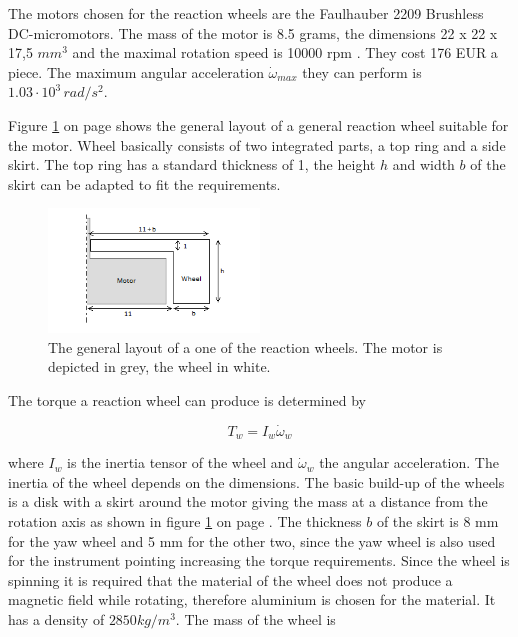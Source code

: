 The motors chosen for the reaction wheels are the Faulhauber 2209 Brushless DC-micromotors. The mass of the motor is 8.5 grams, the dimensions 22 x 22 x 17,5 $mm^3$ and the maximal rotation speed is 10000 rpm \cite{faulhaber}. They cost 176 EUR a piece. The maximum angular acceleration $\dot{\omega}_{max}$ they can perform is $1.03\cdot 10^3\,rad/s^2$. 

Figure \ref{fig:wheel} on page \pageref{fig:wheel} shows the general layout of a general reaction wheel suitable for the motor. Wheel basically consists of two integrated parts, a top ring and a side skirt. The top ring has a standard thickness of 1, the height $h$ and width $b$ of the skirt can be adapted to fit the requirements. 

\begin{figure}
\centering
\includegraphics[width=0.5\textwidth]{chapters/img/reactionwheel.png}
\caption[Basic reaction wheel]{The general layout of a one of the reaction wheels. The motor is depicted in grey, the wheel in white.}
\label{fig:wheel}
\end{figure}

The torque a reaction wheel can produce is determined by

\begin{equation}
T_w = I_w \dot{\omega}_w
\label{wheeltorque}
\end{equation}

where $I_w$ is the inertia tensor of the wheel and $\dot{\omega}_w$ the angular acceleration. The inertia of the wheel depends on the dimensions.  The basic build-up of the wheels is a disk with a skirt around the motor giving the mass at a distance from the rotation axis as shown in figure \ref{fig:wheel} on page \pageref{fig:wheel}. The thickness $b$ of the skirt is 8 mm for the yaw wheel and 5 mm for the other two, since the yaw wheel is also used for the instrument pointing increasing the torque requirements. Since the wheel is spinning it is required that the material of the wheel does not produce a magnetic field while rotating, therefore aluminium is chosen for the material. It has a density of $2850 kg/m^3$. The mass of the wheel is 

